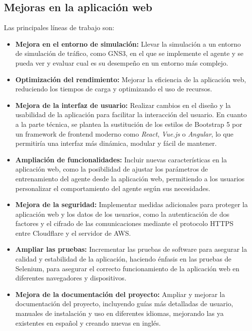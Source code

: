 \subsection{Mejoras en la aplicación web}
Las principales líneas de trabajo son:
\begin{itemize}
    \item \textbf{Mejora en el entorno de simulación:} Llevar la simulación a un entorno de simulación de tráfico, como GNS3, en el que se implemente el agente y se pueda ver y evaluar cual es su desempeño en un entorno más complejo.
    \item \textbf{Optimización del rendimiento:} Mejorar la eficiencia de la aplicación web, reduciendo los tiempos de carga y optimizando el uso de recursos.
    \item \textbf{Mejora de la interfaz de usuario:} Realizar cambios en el diseño y la usabilidad de la aplicación para facilitar la interacción del usuario. En cuanto a la parte técnica, se plantea la sustitución de los estilos de Bootstrap 5 por un framework de frontend moderno como \textit{React}, \textit{Vue.js} o \textit{Angular}, lo que permitiría una interfaz más dinámica, modular y fácil de mantener.
    \item \textbf{Ampliación de funcionalidades:} Incluir nuevas características en la aplicación web, como la posibilidad de ajustar los parámetros de entrenamiento del agente desde la aplicación web, permitiendo a los usuarios personalizar el comportamiento del agente según sus necesidades.
    \item \textbf{Mejora de la seguridad:} Implementar medidas adicionales para proteger la aplicación web y los datos de los usuarios, como la autenticación de dos factores y el cifrado de las comunicaciones mediante el protocolo HTTPS entre Cloudflare y el servidor de AWS.
    \item \textbf{Ampliar las pruebas:} Incrementar las pruebas de software para asegurar la calidad y estabilidad de la aplicación, haciendo énfasis en las pruebas de Selenium, para asegurar el correcto funcionamiento de la aplicación web en diferentes navegadores y dispositivos.
    \item \textbf{Mejora de la documentación del proyecto:} Ampliar y mejorar la documentación del proyecto, incluyendo guías más detalladas de usuario, manuales de instalación y uso en diferentes idiomas, mejorando las ya existentes en español y creando nuevas en inglés.
\end{itemize}
